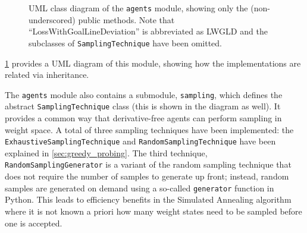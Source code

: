 \begin{figure}
{
    }
    \caption{UML class diagram of the \texttt{agents} module, showing only the (non-underscored) public methods. Note that ``LossWithGoalLineDeviation'' is abbreviated as LWGLD and the subclasses of \texttt{SamplingTechnique} have been omitted.}
    \label{fig:agents_uml}
\end{figure}
\ref{fig:agents_uml} provides a UML diagram of this module, showing how the implementations are related via inheritance.

The \texttt{agents} module also contains a submodule, \texttt{sampling}, which defines the abstract \texttt{SamplingTechnique} class (this is shown in the diagram as well).
It provides a common way that derivative-free agents can perform sampling in weight space. 
A total of three sampling techniques have been implemented:
the \texttt{ExhaustiveSamplingTechnique} and \texttt{RandomSamplingTechnique} have been explained in \ref{sec:greedy_probing}. 
The third technique, \texttt{RandomSamplingGenerator} is a variant of the random sampling technique that does not require the number of samples to generate up front; instead, random samples are generated on demand using a so-called \texttt{generator} function in Python.
This leads to efficiency benefits in the Simulated Annealing algorithm where it is not known a priori how many weight states need to be sampled before one is accepted.

